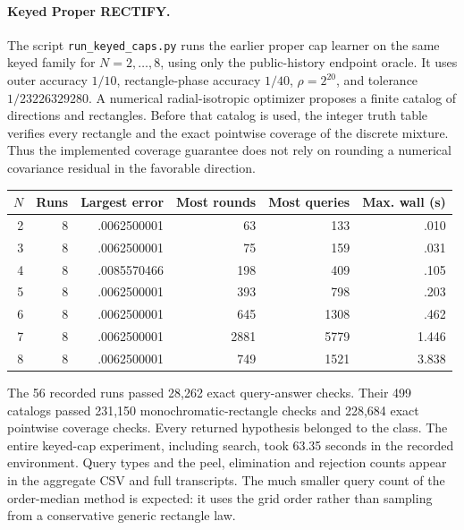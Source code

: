 \paragraph{Keyed Proper RECTIFY.}
The script \texttt{run\_keyed\_caps.py} runs the earlier proper cap learner on the same keyed family for $N=2,\ldots,8$, using only the public-history endpoint oracle. It uses outer accuracy $1/10$, rectangle-phase accuracy $1/40$, $\rho=2^{20}$, and tolerance $1/23226329280$. A numerical radial-isotropic optimizer proposes a finite catalog of directions and rectangles. Before that catalog is used, the integer truth table verifies every rectangle and the exact pointwise coverage of the discrete mixture. Thus the implemented coverage guarantee does not rely on rounding a numerical covariance residual in the favorable direction.

\begin{center}\small
\begin{tabular}{rrrrrr}
\toprule
$N$&Runs&Largest error&Most rounds&Most queries&Max. wall (s)\\
\midrule
2&8&.0062500001&63&133&.010\\
3&8&.0062500001&75&159&.031\\
4&8&.0085570466&198&409&.105\\
5&8&.0062500001&393&798&.203\\
6&8&.0062500001&645&1308&.462\\
7&8&.0062500001&2881&5779&1.446\\
8&8&.0062500001&749&1521&3.838\\
\bottomrule
\end{tabular}
\end{center}
The 56 recorded runs passed 28,262 exact query-answer checks. Their 499 catalogs passed 231,150 monochromatic-rectangle checks and 228,684 exact pointwise coverage checks. Every returned hypothesis belonged to the class. The entire keyed-cap experiment, including search, took 63.35 seconds in the recorded environment. Query types and the peel, elimination and rejection counts appear in the aggregate CSV and full transcripts. The much smaller query count of the order-median method is expected: it uses the grid order rather than sampling from a conservative generic rectangle law.

